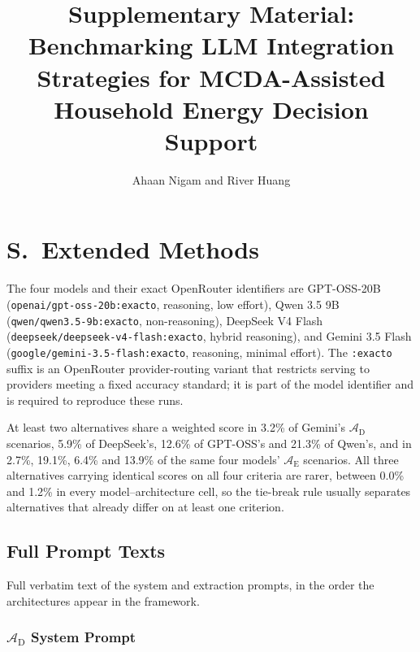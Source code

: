 \documentclass[11pt]{article}
\title{Supplementary Material: Benchmarking LLM Integration Strategies for MCDA-Assisted Household Energy Decision Support}
\author{Ahaan Nigam and River Huang}
\date{}
\newcounter{suppsectioncounter}
\newcommand{\suppsection}[1]{%
  \stepcounter{suppsectioncounter}%
  \section*{S\thesuppsectioncounter.\ #1}%
  \setcounter{table}{0}\setcounter{figure}{0}\setcounter{equation}{0}%
  \renewcommand{\theHtable}{S\thesuppsectioncounter.\arabic{table}}%
  \renewcommand{\theHfigure}{S\thesuppsectioncounter.\arabic{figure}}%
}
\begin{document}
\maketitle
\suppsection{Extended Methods}
\label{app:model_routing}

The four models and their exact OpenRouter identifiers are GPT-OSS-20B (\texttt{openai/gpt-oss-20b:exacto}, reasoning, low effort), Qwen 3.5 9B (\texttt{qwen/qwen3.5-9b:exacto}, non-reasoning), DeepSeek V4 Flash (\texttt{deepseek/deepseek-v4-flash:exacto}, hybrid reasoning), and Gemini 3.5 Flash (\texttt{google/gemini-3.5-flash:exacto}, reasoning, minimal effort). The \texttt{:exacto} suffix is an OpenRouter provider-routing variant that restricts serving to providers meeting a fixed accuracy standard; it is part of the model identifier and is required to reproduce these runs.

At least two alternatives share a weighted score in 3.2\% of Gemini's $\mathcal{A}_{\text{D}}$ scenarios, 5.9\% of DeepSeek's, 12.6\% of GPT-OSS's and 21.3\% of Qwen's, and in 2.7\%, 19.1\%, 6.4\% and 13.9\% of the same four models' $\mathcal{A}_{\text{E}}$ scenarios. All three alternatives carrying identical scores on all four criteria are rarer, between 0.0\% and 1.2\% in every model--architecture cell, so the tie-break rule usually separates alternatives that already differ on at least one criterion.
\subsection{Full Prompt Texts}
\label{app:prompts}

Full verbatim text of the system and extraction prompts, in the order the architectures appear in the framework.

\subsubsection{\texorpdfstring{$\mathcal{A}_{\text{D}}$}{A\_D} System Prompt}
\end{document}
